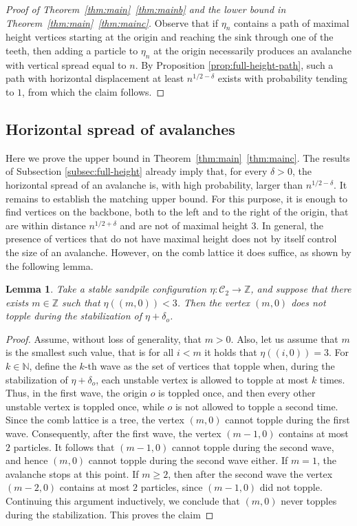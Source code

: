 \documentclass[11pt]{article}
\newtheorem{lemma}{Lemma}[section]
\begin{document}
\begin{proof}[Proof of Theorem~\ref{thm:main}~\ref{thm:mainb}  and the lower bound in Theorem~\ref{thm:main}~\ref{thm:mainc}]
Observe that if $\eta_n$ contains a path of maximal height vertices starting at the origin and reaching the sink through one of the teeth, then adding a particle to $\eta_n$ at the origin necessarily produces an avalanche with vertical spread equal to $n$. By Proposition \ref{prop:full-height-path}, such a path with horizontal displacement at least $n^{1/2-\delta}$ exists with probability tending to $1$, from which the claim follows.
\end{proof}

\subsection{Horizontal spread of avalanches}\label{sec:hor-spread}

Here we prove the upper bound in Theorem~\ref{thm:main}~\ref{thm:mainc}.  The results of Subsection \ref{subsec:full-height} already imply that, for every $\delta>0$, the horizontal spread of an avalanche is, with high probability, larger than $n^{1/2-\delta}$. It remains to establish the matching upper bound. For this purpose, it is enough to find vertices on the backbone, both to the left and to the right of the origin, that are within distance $n^{1/2+\delta}$ and are not of maximal height $3$. In general, the presence of vertices that do not have maximal height does not by itself control the size of an avalanche. However, on the comb lattice it does suffice, as shown by the following lemma.

\begin{lemma}\label{lem:not-full-height-aval}
  Take a stable sandpile configuration $\eta:\mathcal{C}_2\to\mathbb{Z}$, and suppose that there exists $m\in\mathbb{Z}$ such that $\eta((m,0))<3$. Then the vertex $(m,0)$ does not topple during the stabilization of $\eta+\delta_o$.
\end{lemma}

\begin{proof}
    Assume, without loss of generality, that $m>0$. Also, let us assume that $m$ is the smallest such value, that is for all $i<m$ it holds that $\eta((i,0))=3$. For $k\in\mathbb{N}$, define the $k$-th wave as the set of vertices that topple when, during the stabilization of $\eta+\delta_o$, each unstable vertex is allowed to topple at most $k$ times. Thus, in the first wave, the origin $o$ is toppled once, and then every other unstable vertex is toppled once, while $o$ is not allowed to topple a second time. Since the comb lattice is a tree, the vertex $(m,0)$ cannot topple during the first wave. Consequently, after the first wave, the vertex $(m-1,0)$ contains at most $2$ particles. It follows that $(m-1,0)$ cannot topple during the second wave, and hence $(m,0)$ cannot topple during the second wave either. If $m=1$, the avalanche stops at this point. If $m\geq 2$, then after the second wave the vertex $(m-2,0)$ contains at most $2$ particles, since $(m-1,0)$ did not topple. Continuing this argument inductively, we conclude that $(m,0)$ never topples during the stabilization. This 
    proves the claim
\end{proof}
\end{document}
